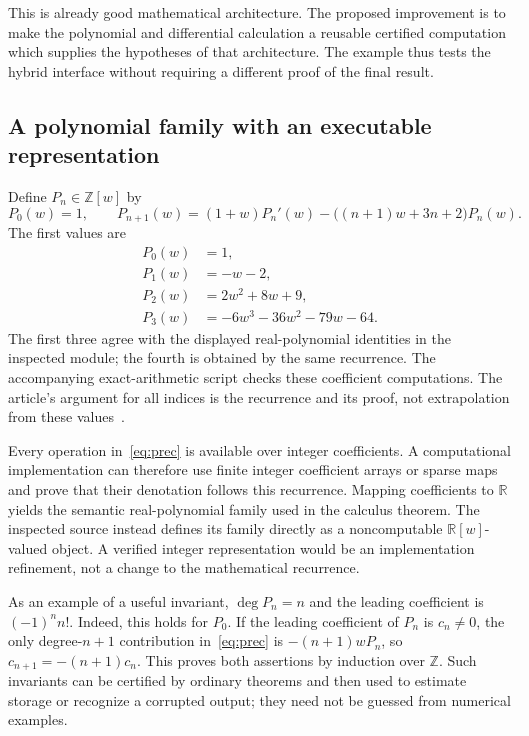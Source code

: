 \documentclass[11pt,a4paper]{article}
\newcommand{\R}{\mathbb R}
\newcommand{\Z}{\mathbb Z}
\theoremstyle{remark}
\begin{document}
This is already good mathematical architecture. The proposed improvement is to
make the polynomial and differential calculation a reusable certified computation
which supplies the hypotheses of that architecture. The example thus tests the
hybrid interface without requiring a different proof of the final result.

\subsection{A polynomial family with an executable representation}
Define $P_n\in\Z[w]$ by
\begin{equation}
 P_0(w)=1,\qquad
 P_{n+1}(w)=(1+w)P_n'(w)
       -\bigl((n+1)w+3n+2\bigr)P_n(w).
 \label{eq:prec}
\end{equation}
The first values are
\begin{align*}
 P_0(w)&=1,\\
 P_1(w)&=-w-2,\\
 P_2(w)&=2w^2+8w+9,\\
 P_3(w)&=-6w^3-36w^2-79w-64.
\end{align*}
The first three agree with the displayed real-polynomial identities in the
inspected module; the fourth is obtained by the same recurrence. The accompanying
exact-arithmetic script checks these coefficient computations. The article's
argument for all indices is the recurrence and its proof, not extrapolation from
these values~\cite{plambert}.

Every operation in~\eqref{eq:prec} is available over integer coefficients.
A computational implementation can therefore use finite integer coefficient
arrays or sparse maps and prove that their denotation follows this recurrence.
Mapping coefficients to $\R$ yields the semantic real-polynomial family used in
the calculus theorem. The inspected source instead defines its family directly
as a noncomputable $\R[w]$-valued object. A verified integer representation would
be an implementation refinement, not a change to the mathematical recurrence.

As an example of a useful invariant, $\deg P_n=n$ and the leading coefficient is
$(-1)^n n!$. Indeed, this holds for $P_0$. If the leading coefficient of $P_n$ is
$c_n\ne0$, the only degree-$n+1$ contribution in~\eqref{eq:prec} is
$-(n+1)wP_n$, so $c_{n+1}=-(n+1)c_n$. This proves both assertions by induction
over $\Z$. Such invariants can be certified by ordinary theorems and then used to
estimate storage or recognize a corrupted output; they need not be guessed from
numerical examples.
\end{document}
